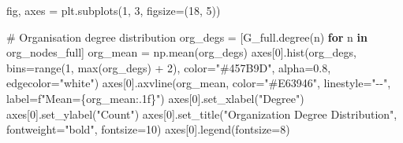 \documentclass[
  letterpaper,
  DIV=11,
  numbers=noendperiod]{scrartcl}
\newenvironment{Shaded}{\begin{snugshade}}{\end{snugshade}}
\newcommand{\BuiltInTok}[1]{\textcolor[rgb]{0.00,0.23,0.31}{#1}}
\newcommand{\CommentTok}[1]{\textcolor[rgb]{0.37,0.37,0.37}{#1}}
\newcommand{\ControlFlowTok}[1]{\textcolor[rgb]{0.00,0.23,0.31}{\textbf{#1}}}
\newcommand{\DecValTok}[1]{\textcolor[rgb]{0.68,0.00,0.00}{#1}}
\newcommand{\FloatTok}[1]{\textcolor[rgb]{0.68,0.00,0.00}{#1}}
\newcommand{\KeywordTok}[1]{\textcolor[rgb]{0.00,0.23,0.31}{\textbf{#1}}}
\newcommand{\NormalTok}[1]{\textcolor[rgb]{0.00,0.23,0.31}{#1}}
\newcommand{\OperatorTok}[1]{\textcolor[rgb]{0.37,0.37,0.37}{#1}}
\newcommand{\SpecialCharTok}[1]{\textcolor[rgb]{0.37,0.37,0.37}{#1}}
\newcommand{\SpecialStringTok}[1]{\textcolor[rgb]{0.13,0.47,0.30}{#1}}
\newcommand{\StringTok}[1]{\textcolor[rgb]{0.13,0.47,0.30}{#1}}
\begin{document}
\begin{Shaded}
\begin{Highlighting}[]
\NormalTok{fig, axes }\OperatorTok{=}\NormalTok{ plt.subplots(}\DecValTok{1}\NormalTok{, }\DecValTok{3}\NormalTok{, figsize}\OperatorTok{=}\NormalTok{(}\DecValTok{18}\NormalTok{, }\DecValTok{5}\NormalTok{))}

\CommentTok{\# Organisation degree distribution}
\NormalTok{org\_degs }\OperatorTok{=}\NormalTok{ [G\_full.degree(n) }\ControlFlowTok{for}\NormalTok{ n }\KeywordTok{in}\NormalTok{ org\_nodes\_full]}
\NormalTok{org\_mean }\OperatorTok{=}\NormalTok{ np.mean(org\_degs)}
\NormalTok{axes[}\DecValTok{0}\NormalTok{].hist(org\_degs, bins}\OperatorTok{=}\BuiltInTok{range}\NormalTok{(}\DecValTok{1}\NormalTok{, }\BuiltInTok{max}\NormalTok{(org\_degs) }\OperatorTok{+} \DecValTok{2}\NormalTok{),}
\NormalTok{             color}\OperatorTok{=}\StringTok{"\#457B9D"}\NormalTok{, alpha}\OperatorTok{=}\FloatTok{0.8}\NormalTok{, edgecolor}\OperatorTok{=}\StringTok{"white"}\NormalTok{)}
\NormalTok{axes[}\DecValTok{0}\NormalTok{].axvline(org\_mean, color}\OperatorTok{=}\StringTok{"\#E63946"}\NormalTok{, linestyle}\OperatorTok{=}\StringTok{"{-}{-}"}\NormalTok{,}
\NormalTok{                label}\OperatorTok{=}\SpecialStringTok{f"Mean=}\SpecialCharTok{\{}\NormalTok{org\_mean}\SpecialCharTok{:.1f\}}\SpecialStringTok{"}\NormalTok{)}
\NormalTok{axes[}\DecValTok{0}\NormalTok{].set\_xlabel(}\StringTok{"Degree"}\NormalTok{)}
\NormalTok{axes[}\DecValTok{0}\NormalTok{].set\_ylabel(}\StringTok{"Count"}\NormalTok{)}
\NormalTok{axes[}\DecValTok{0}\NormalTok{].set\_title(}\StringTok{"Organization Degree Distribution"}\NormalTok{,}
\NormalTok{                  fontweight}\OperatorTok{=}\StringTok{"bold"}\NormalTok{, fontsize}\OperatorTok{=}\DecValTok{10}\NormalTok{)}
\NormalTok{axes[}\DecValTok{0}\NormalTok{].legend(fontsize}\OperatorTok{=}\DecValTok{8}\NormalTok{)}


\end{Highlighting}
\end{Shaded}
\end{document}
